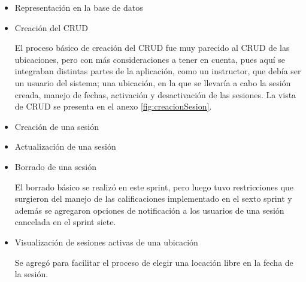 \begin{itemize}


\item Representación en la base de datos

\item Creación del CRUD

El proceso básico de creación del CRUD fue muy parecido al CRUD de las ubicaciones, pero con más consideraciones a tener en cuenta, pues aquí se integraban distintas partes de la aplicación, como un instructor, que debía ser un usuario del sistema; una ubicación, en la que se llevaría a cabo la sesión creada, manejo de fechas, activación y desactivación de las sesiones. La vista de CRUD se presenta en el anexo \ref{fig:creacionSesion}.

\item Creación de una sesión

\item Actualización de una sesión

\item Borrado de una sesión

El borrado básico se realizó en este sprint, pero luego tuvo restricciones que surgieron del manejo de las calificaciones implementado en el sexto sprint y además se agregaron opciones de notificación a los usuarios de una sesión cancelada en el sprint siete. 

\item Visualización de sesiones activas de una ubicación

Se agregó para facilitar el proceso de elegir una locación libre en la fecha de la sesión.

\end{itemize}


